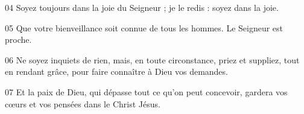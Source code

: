 
04 Soyez toujours dans la joie du Seigneur ; je le redis : soyez dans la joie.

05 Que votre bienveillance soit connue de tous les hommes. Le Seigneur est proche.

06 Ne soyez inquiets de rien, mais, en toute circonstance, priez et suppliez, tout en rendant grâce, pour faire connaître à Dieu vos demandes.

07 Et la paix de Dieu, qui dépasse tout ce qu’on peut concevoir, gardera vos cœurs et vos pensées dans le Christ Jésus.
